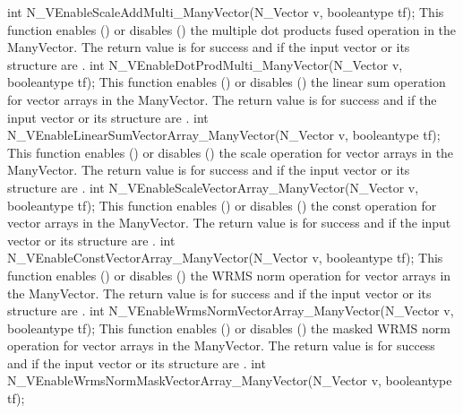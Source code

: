 {
  int N\_VEnableScaleAddMulti\_ManyVector(N\_Vector v, booleantype tf);
}
{
  This function enables () or disables () the multiple
  dot products fused operation in the ManyVector. The return value is 
  for success and  if the input vector or its  structure are
  .
}
{
  int N\_VEnableDotProdMulti\_ManyVector(N\_Vector v, booleantype tf);
}
{
  This function enables () or disables () the linear sum
  operation for vector arrays in the ManyVector. The return value is  for
  success and  if the input vector or its  structure are .
}
{
  int N\_VEnableLinearSumVectorArray\_ManyVector(N\_Vector v, booleantype tf);
}
{
  This function enables () or disables () the scale
  operation for vector arrays in the ManyVector. The return value is  for
  success and  if the input vector or its  structure are .
}
{
  int N\_VEnableScaleVectorArray\_ManyVector(N\_Vector v, booleantype tf);
}
{
  This function enables () or disables () the const
  operation for vector arrays in the ManyVector. The return value is  for
  success and  if the input vector or its  structure are .
}
{
  int N\_VEnableConstVectorArray\_ManyVector(N\_Vector v, booleantype tf);
}
{
  This function enables () or disables () the WRMS norm
  operation for vector arrays in the ManyVector. The return value is  for
  success and  if the input vector or its  structure are .
}
{
  int N\_VEnableWrmsNormVectorArray\_ManyVector(N\_Vector v, booleantype tf);
}
{
  This function enables () or disables () the masked WRMS
  norm operation for vector arrays in the ManyVector. The return value is
   for success and  if the input vector or its  structure are
  .
}
{
  int N\_VEnableWrmsNormMaskVectorArray\_ManyVector(N\_Vector v, booleantype tf);
}

